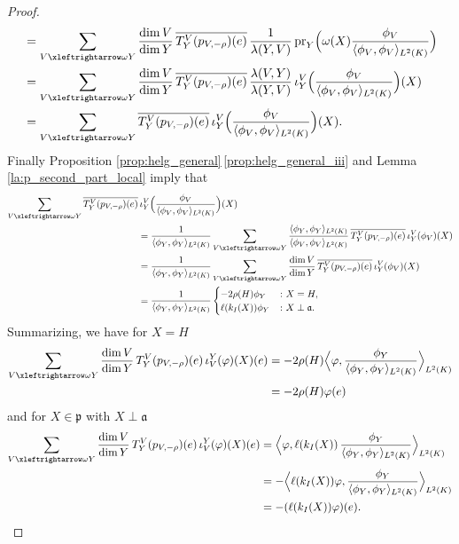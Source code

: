 \documentclass[JEP,XML,SOM,NoFloatCountersInSection,Unicode,published]{cedram}
\theoremstyle{definition}
\newcommand{\lraomega}{\ensuremath{\xleftrightarrow\omega}}
\newcommand{\mf}[1]{\ensuremath{\mathfrak{#1}}}
\newcommand{\on}[1]{\ensuremath{\operatorname{#1}}}
\newcommand{\rhoa}{\ensuremath{\rho}}
\newcommand{\Ik}[1]{\ensuremath{k_I(#1)}}
\begin{document}
\begin{proof}
\begin{align*}
&=\sum_{V\lraomega Y}\frac{\dim V}{\dim Y}\,\overline{T_{Y}^V(p_{V,-\rhoa})(e)}\,\frac{1}{\lambda(Y,V)}\on{pr}_Y\Bigl(\omega(X)\frac{\phi_V}{\langle\phi_V,\phi_V\rangle_{L^2(K)}}\Bigr)\\
&=\sum_{V\lraomega Y}\frac{\dim V}{\dim Y}\,\overline{T_{Y}^V(p_{V,-\rhoa})(e)}\,\frac{\lambda(V,Y)}{\lambda(Y,V)}\,\iota_Y^V\Bigl(\frac{\phi_V}{\langle\phi_V,\phi_V\rangle_{L^2(K)}}\Bigr)(X)\\
&=\sum_{V\lraomega Y}\overline{T_{Y}^V(p_{V,-\rhoa})(e)}\,\iota_Y^V\Bigl(\frac{\phi_V}{\langle\phi_V,\phi_V\rangle_{L^2(K)}}\Bigr)(X).
\end{align*}
Finally Proposition \ref{prop:helg_general}\,\eqref{prop:helg_general_iii} and Lemma \ref{la:p_second_part_local} imply that
\begin{align*}
\sum_{V\lraomega Y}\overline{T_{Y}^V(p_{V,-\rhoa})(e)}&\,\iota_Y^V\Bigl(\frac{\phi_V}{\langle\phi_V,\phi_V\rangle_{L^2(K)}}\Bigr)(X)\\
&=\frac{1}{\langle\phi_Y,\phi_Y\rangle_{L^2(K)}}\sum_{V\lraomega Y}\frac{\langle\phi_Y,\phi_Y\rangle_{L^2(K)}}{\langle\phi_V,\phi_V\rangle_{L^2(K)}}\,\overline{T_{Y}^V(p_{V,-\rhoa})(e)}\,\iota_Y^V(\phi_V)(X)\\
&=\frac{1}{\langle\phi_Y,\phi_Y\rangle_{L^2(K)}}\sum_{V\lraomega Y}\frac{\dim V}{\dim Y}\,\overline{T_{Y}^V(p_{V,-\rhoa})(e)}\,\iota_Y^V(\phi_V)(X)\\
&=\frac{1}{\langle\phi_Y,\phi_Y\rangle_{L^2(K)}}\begin{cases}
-2\rhoa(H)\phi_Y&\colon X=H,\\
\ell(\Ik{X})\phi_Y&\colon X\perp\mf a.
\end{cases}
\end{align*}
Summarizing, we have for $X=H$
\begin{align*}
\sum_{V\lraomega Y}\frac{\dim V}{\dim Y}\,T_{Y}^V(p_{V,-\rhoa})(e)\,\iota_V^{Y}(\varphi)(X)(e)
&=-2\rhoa(H)\Bigl\langle\varphi,\frac{\phi_Y}{\langle\phi_Y,\phi_Y\rangle_{L^2(K)}} \Bigr\rangle_{L^2(K)}\\
&=-2\rhoa(H)\varphi(e)
\end{align*}
and for $X\in\mf p$ with $X\perp\mf a$
\begin{align*}
\sum_{V\lraomega Y}\frac{\dim V}{\dim Y}\,T_{Y}^V(p_{V,-\rhoa})(e)\,\iota_V^{Y}(\varphi)(X)(e)&= \Bigl\langle\varphi,\ell(\Ik{X})\,\frac{\phi_Y}{\langle\phi_Y,\phi_Y\rangle_{L^2(K)}} \Bigr\rangle_{L^2(K)}\\
&=-\Bigl\langle\ell(\Ik{X})\varphi,\frac{\phi_Y}{\langle\phi_Y,\phi_Y\rangle_{L^2(K)}} \Bigr\rangle_{L^2(K)}\\
&=-(\ell(\Ik{X})\varphi)(e).\qedhere
\end{align*}
\end{proof}
\end{document}
